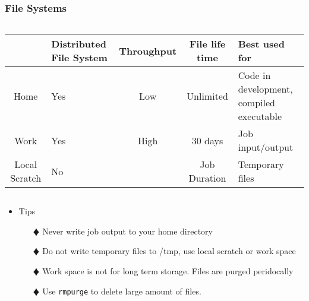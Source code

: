 \documentclass[slidestop,mathserif,compress,xcolor=svgnames,table]{beamer}
\begin{document}
\begin{frame}
\frametitle{\small File Systems}
\scriptsize{
\begin{columns}
\column{11cm}
\begin{block}{}
\begin{center}
\begin{tabular}{|c|p{1.5cm}|c|c|p{2.5cm}|}
\hline
& Distributed File System & Throughput & File life time & Best used for \\
\hline
{Home} & Yes & Low & Unlimited & {Code in development, compiled executable}\\ 
\hline
Work & Yes & High & 30 days & Job input/output \\
\hline
{Local Scratch} & No & & Job Duration & Temporary files \\
\hline
\end{tabular}
\end{center}
\end{block}
\end{columns}
}
\begin{itemize}
\item {\footnotesize Tips}
\begin{enumerate}
\item[$\vardiamond$] Never write job output to your home directory
\item[$\vardiamond$] Do not write temporary files to /tmp, use local scratch or work space
\item[$\vardiamond$] Work space is not for long term storage. Files are purged peridocally
\item[$\vardiamond$] Use \texttt{rmpurge} to delete large amount of files.
\end{enumerate}
\end{itemize}
\end{frame}
\end{document}
